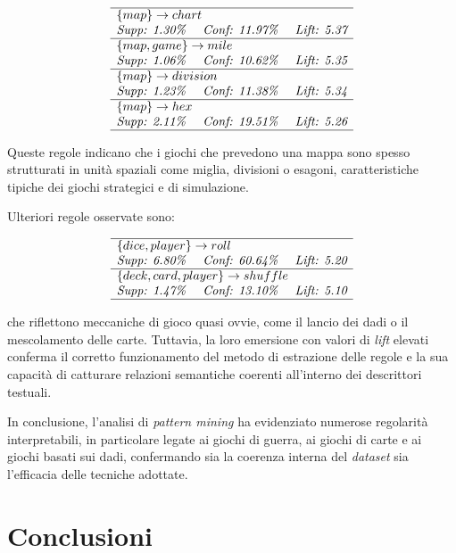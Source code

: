 \documentclass[10pt,twocolumn]{article}
\begin{document}
\[
\begin{array}{l}
\hline
\{map\} \to chart \\
\textit{Supp: 1.30\% \quad Conf: 11.97\% \quad Lift: 5.37} \\
\hline
\{map, game\} \to mile \\
\textit{Supp: 1.06\% \quad Conf: 10.62\% \quad Lift: 5.35} \\
\hline
\{map\} \to division \\
\textit{Supp: 1.23\% \quad Conf: 11.38\% \quad Lift: 5.34} \\
\hline
\{map\} \to hex \\
\textit{Supp: 2.11\% \quad Conf: 19.51\% \quad Lift: 5.26} \\
\hline
\end{array}
\]

Queste regole indicano che i giochi che prevedono una mappa sono spesso strutturati in unità spaziali come miglia, divisioni o esagoni, caratteristiche tipiche dei giochi strategici e di simulazione.

Ulteriori regole osservate sono:

\[
\begin{array}{l}
\hline
\{dice, player\} \to roll \\
\textit{Supp: 6.80\% \quad Conf: 60.64\% \quad Lift: 5.20} \\
\hline
\{deck, card, player\} \to shuffle \\
\textit{Supp: 1.47\% \quad Conf: 13.10\% \quad Lift: 5.10} \\
\hline
\end{array}
\]

che riflettono meccaniche di gioco quasi ovvie, come il lancio dei dadi o il mescolamento delle carte. Tuttavia, la loro emersione con valori di \textit{lift} elevati conferma il corretto funzionamento del metodo di estrazione delle regole e la sua capacità di catturare relazioni semantiche coerenti all’interno dei descrittori testuali.


In conclusione, l’analisi di \textit{pattern mining} ha evidenziato numerose regolarità interpretabili, in particolare legate ai giochi di guerra, ai giochi di carte e ai giochi basati sui dadi, confermando sia la coerenza interna del \textit{dataset} sia l’efficacia delle tecniche adottate.



\section{Conclusioni}
\end{document}
